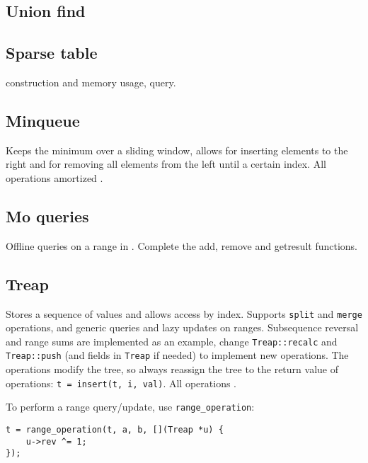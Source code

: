 \subsection{Union find}


\subsection{Sparse table}
 construction and memory usage,  query.


\subsection{Minqueue}
Keeps the minimum over a sliding window, allows for inserting elements to the right and for removing all elements from the left until a certain index. All operations amortized .


\subsection{Mo queries}
Offline queries on a range in . Complete the add, remove and getresult functions.


\subsection{Treap}

Stores a sequence of values and allows access by index. Supports \texttt{split} and \texttt{merge} operations, and generic queries and lazy updates on ranges. Subsequence reversal and range sums are implemented as an example, change \texttt{Treap::recalc} and \texttt{Treap::push} (and fields in \texttt{Treap} if needed) to implement new operations.
The operations modify the tree, so always reassign the tree to the return value of operations: \texttt{t = insert(t, i, val)}.
All operations .

To perform a range query/update, use \texttt{range\_operation}:

\begin{lstlisting}
t = range_operation(t, a, b, [](Treap *u) {
	u->rev ^= 1;
});
\end{lstlisting}

